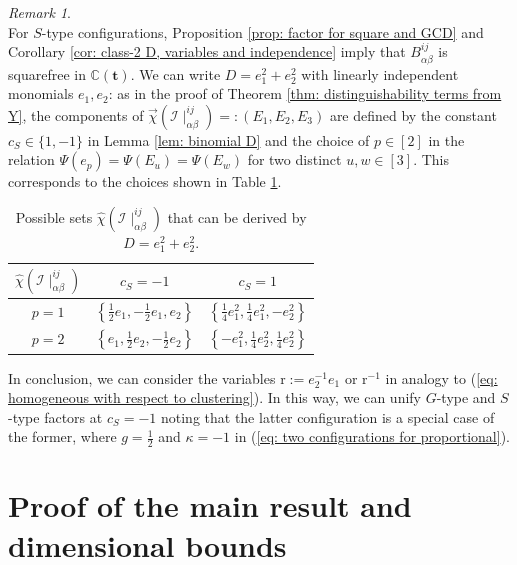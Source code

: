 \documentclass[10pt]{article}
\theoremstyle{remark}%
\newtheorem{rem}{Remark}%
\theoremstyle{definition}%
\begin{document}
\begin{rem}
\begin{equation}
    \label{eq: intertwined configurations}
 \end{equation}
For $S$-type configurations, Proposition \ref{prop: factor for square and GCD} and Corollary \ref{cor: class-2 D, variables and independence} imply that $B_{\alpha\beta}^{ij}$ is squarefree in $\mathbb{C}(\mathbf{t})$. We can write $D=e_{1}^{2}+e_{2}^{2}$ with linearly independent monomials $e_{1},e_{2}$: as in the proof of Theorem \ref{thm: distinguishability terms from Y}, the components of $\overrightarrow{\chi}(\mathcal{I}\mid_{\alpha\beta}^{ij})=:(E_{1},E_{2},E_{3})$ are defined by the constant $c_{S}\in\{1,-1\}$ in Lemma \ref{lem: binomial D} 
and the choice of $p\in [2]$ in the relation $\Psi(e_{p})=\Psi(E_{u})=\Psi(E_{w})$ for two distinct $u,w\in[3]$. This corresponds to the choices shown in Table \ref{tab: type-S possible configuration sets}. 
\begin{table}
\begin{centering}
\begin{tabular}{|c|c|c|}
\hline 
$\hat{\chi}(\mathcal{I}\mid_{\alpha\beta}^{ij})$ & $c_{S}=-1$ & $c_{S}=1$\tabularnewline
\hline 
\hline 
$p=1$ & $\left\{ \frac{1}{2}e_{1},-\frac{1}{2}e_{1},e_{2}\right\} $ & $\left\{ \frac{1}{4}e_{1}^{2},\frac{1}{4}e_{1}^{2},-e_{2}^{2}\right\} $\tabularnewline
\hline 
$p=2$ & $\left\{ e_{1},\frac{1}{2}e_{2},-\frac{1}{2}e_{2}\right\} $ & $\left\{ -e_{1}^{2},\frac{1}{4}e_{2}^{2},\frac{1}{4}e_{2}^{2}\right\} $\tabularnewline
\hline 
\end{tabular}
\par\end{centering}
\centering{}\caption{\label{tab: type-S possible configuration sets}Possible sets $\hat{\chi}(\mathcal{I}\mid_{\alpha\beta}^{ij})$
that can be derived by $D=e_{1}^{2}+e_{2}^{2}$.}
\end{table}
In conclusion, we can consider the variables $\mathrm{r}:=e_{2}^{-1}e_{1}$ or $\mathrm{r}^{-1}$ in analogy to (\ref{eq: homogeneous with respect to clustering}). In this way, we can unify $G$-type and $S$-type factors at $c_{S}=-1$ noting that the latter configuration is a special case of the former, where $g=\frac{1}{2}$ and $\kappa=-1$ in (\ref{eq: two configurations for proportional}). 
\end{rem}

\section{\label{sec: proof of theorem} Proof of the main result and dimensional bounds} 
\end{document}
